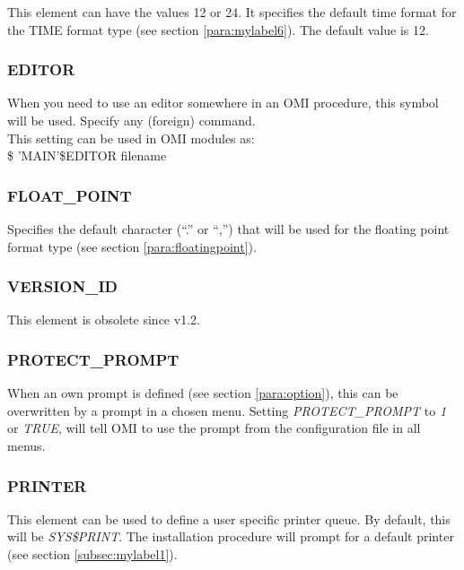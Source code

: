 \documentclass[a4paper]{book}
\renewcommand{\indent}{\hspace*{5mm}}
\begin{document}
This element can have the values 12 or 24. It specifies the default time 
format for the TIME format type (see section \ref{para:mylabel6}). The
default value is 12.

\subsubsection{EDITOR}
\label{para:editorlement}

When you need to use an editor somewhere in an OMI procedure, this symbol 
will be used. Specify any (foreign) command. \\
This setting can be used in OMI modules as: \\
\indent\textsf{{\$} 'MAIN'{\$}EDITOR filename}

\subsubsection{FLOAT{\_}POINT}
\label{para:float}

Specifies the default character (``.'' or ``,'') that will be used for the 
floating point format type (see section \ref{para:floatingpoint}).

\subsubsection*{VERSION{\_}ID}

This element is obsolete since v1.2.

\subsubsection{PROTECT{\_}PROMPT}
\label{para:protect}

When an own prompt is defined (see section \ref{para:option}),
this can be overwritten by a prompt in a chosen menu. Setting 
\linebreak\textsl{PROTECT{\_}PROMPT} to \textsl{1} or \textsl{TRUE}, will tell OMI to use the prompt from 
the configuration file in all menus.

\subsubsection{PRINTER}

This element can be used to define a user specific printer queue. By 
default, this will be \textsl{SYS{\$}PRINT}. The installation procedure will prompt 
for a default printer (see section \ref{subsec:mylabel1}).
\end{document}
